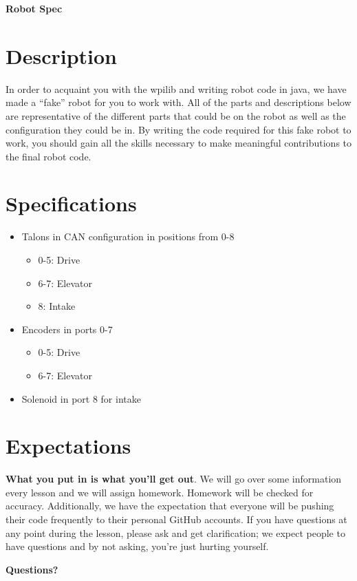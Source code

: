 \documentclass[11pt,fleqn]{article}
\begin{document}
\begin{center}
{\Huge
\textbf{Robot Spec}
}\\
\end{center}

\section*{Description}
In order to acquaint you with the wpilib and writing robot code in java, we have made a ``fake'' robot
for you to work with. All of the parts and descriptions below are representative of the different parts
that could be on the robot as well as the configuration they could be in. By writing the code required
for this fake robot to work, you should gain all the skills necessary to make meaningful contributions
to the final robot code. 

\section*{Specifications}
\begin{itemize}
	\item 
	Talons in CAN configuration in positions from 0-8
	\begin{itemize}
		\item 
		0-5: Drive

		\item 
		6-7: Elevator

		\item 
		8: Intake
	\end{itemize}

	\item 
	Encoders in ports 0-7
	\begin{itemize}
		\item 
		0-5: Drive

		\item 
		6-7: Elevator
	\end{itemize}

	\item 
	Solenoid in port 8 for intake
\end{itemize}

\section*{Expectations}
\textbf{What you put in is what you'll get out}. We will go over some information every lesson and
we will assign homework. Homework will be checked for accuracy. Additionally, we have the expectation
that everyone will be pushing their code frequently to their personal GitHub accounts. If you have questions
at any point during the lesson, please ask and get clarification; we expect people to have questions and
by not asking, you're just hurting yourself. 

\begin{center}
{\huge
\textbf{Questions?}
}
\end{center}
\end{document}
